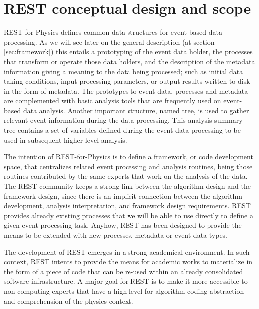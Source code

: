 \section{REST conceptual design and scope}
\label{sec:conception}

REST-for-Physics defines common data structures for event-based data processing. As we will see later on the general description (at section\,\ref{sec:framework}) this entails a prototyping of the event data holder, the processes that transform or operate those data holders, and the description of the metadata information giving a meaning to the data being processed; such as initial data taking conditions, input processing parameters, or output results written to disk in the form of metadata.
The prototypes to event data, processes and metadata are complemented  with basic analysis tools that are frequently used on event-based data analysis. Another important structure, named tree, is used to gather relevant event information during the data processing. This analysis summary tree contains a set of variables defined during the event data processing to be used in subsequent higher level analysis.

The intention of REST-for-Physics is to define a framework, or code development space, that centralizes related event processing and analysis routines, being those routines contributed by the same experts that work on the analysis of the data. The REST community keeps a strong link between the algorithm design and the framework design, since there is an implicit connection between the algorithm development, analysis interpretation, and framework design requirements. REST provides already existing processes that we will be able to use directly to define a given event processing task. Anyhow, REST has been designed to provide the means to be extended with new processes, metadata or event data types.

The development of REST emerges in a strong academical environment. In such context, REST intents to provide the means for academic works to materialize in the form of a piece of code that can be re-used within an already consolidated software infrastructure. A major goal for REST is to make it more accessible to non-computing experts that have a high level for algorithm coding abstraction and comprehension of the physics context.

